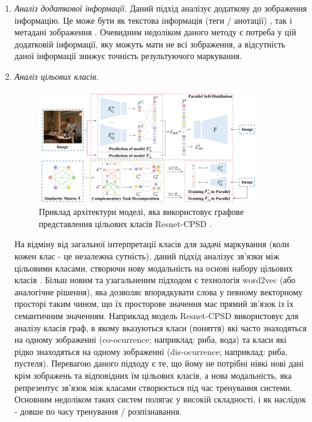 \documentclass{udstu}
\begin{document}
\begin{enumerate}
	\item \textit{Аналіз додаткової інформації.}
	Даний підхід аналізує додаткову до зображення інформацію.
	Це може бути як текстова інформація (теги / анотації) \cite{cnn-sinn,sr-cnn-rnn},
	так і метадані зображення \cite{cnn-neighbors,cnn-location}.
	Очевидним недоліком даного методу є потреба у цій додатковій інформації,
	яку можуть мати не всі зображення, а відсутність даної інформації
	знижує точність результуючого маркування.

	\item \textit{Аналіз цільових класів.}

	\begin{figure}[!ht]
	\centering
	\includegraphics[width=0.9\textwidth]{PNG/resnet-cpsd-arch}
	\caption{
	Приклад архітектури моделі, яка використовує
	графове представлення цільових класів Resnet-CPSD \cite{cpsd}.
	}
	\label{figure:resnet-cpsd}
	\end{figure}

	На відміну від загальної інтерпретації класів для задачі маркування
	(коли кожен клас - це незалежна сутність), даний підхід аналізує зв'язки між цільовими класами,
	створючи нову модальність на основі набору цільових класів \cite{srn}.
	Більш новим та узагальненим підходом є технологія word2vec (або аналогічне рішення), яка дозволяє
	впорядкувати слова у певному векторному просторі таким чином, що їх просторове значення має
	прямий зв'язок із їх семантичним значенням. Наприклад модель Resnet-CPSD \cite{cpsd} використовує для аналізу класів
	граф, в якому вказуються класи (поняття) які часто знаходяться на одному зображенні
	(co-ocurrence; наприклад: риба, вода) та класи які рідко знаходяться
	на одному зображенні (dis-ocurrence; наприклад: риба, пустеля).
	Перевагою даного підходу є те, що йому не потрібні ніякі нові дані крім зображень та
	відповідних їм цільових класів, а нова модальність, яка репрезентує зв'язок між класами
	створюється під час тренування системи. Основним недоліком таких систем полягає у
	високій складності, і як наслідок - довше по часу тренування / розпізнавання.
\end{enumerate}
\end{document}
